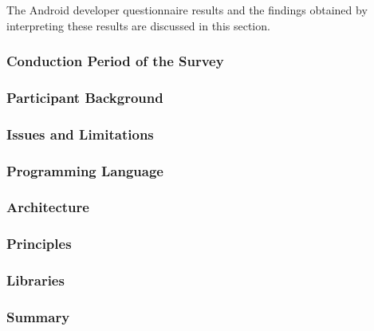 The Android developer questionnaire results and the findings obtained by interpreting these results are discussed in this section.

\subsubsection{Conduction Period of the Survey}


\subsubsection{Participant Background}


\subsubsection{Issues and Limitations}


\subsubsection{Programming Language}


\subsubsection{Architecture}


\subsubsection{Principles}


\subsubsection{Libraries}


\subsubsection{Summary}

